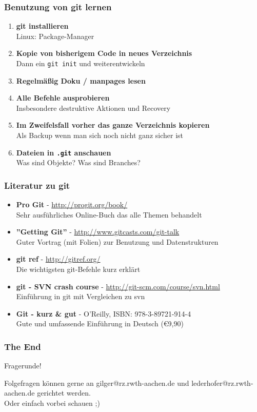 \begin{frame}
  \frametitle{Benutzung von git lernen}
  \begin{enumerate}
    \item {\bf git installieren} \\ Linux: Package-Manager
    \item {\bf Kopie von bisherigem Code in neues Verzeichnis} \\ Dann ein {\tt git init} und weiterentwickeln
    \item {\bf Regelmäßig Doku / manpages lesen}
    \item {\bf Alle Befehle ausprobieren} \\ Insbesondere destruktive Aktionen und Recovery
    \item {\bf Im Zweifelsfall vorher das ganze Verzeichnis kopieren} \\ Als Backup wenn man sich noch nicht ganz sicher ist
    \item {\bf Dateien in {\tt .git} anschauen} \\ Was sind Objekte? Was sind Branches?
  \end{enumerate}
\end{frame}

\begin{frame}
  \frametitle{Literatur zu git}
  \begin{itemize}
    \item {\bf Pro Git} - \url{http://progit.org/book/} \\ Sehr ausführliches Online-Buch das alle Themen behandelt
    \item {\bf ''Getting Git''} - \url{http://www.gitcasts.com/git-talk} \\ Guter Vortrag (mit Folien) zur Benutzung und Datenstrukturen
    \item {\bf git ref} - \url{http://gitref.org/} \\ Die wichtigsten git-Befehle kurz erklärt
    \item {\bf git - SVN crash course} - \url{http://git-scm.com/course/svn.html} \\ Einführung in git mit Vergleichen zu svn
    \item {\bf Git - kurz \& gut} - O'Reilly, ISBN: 978-3-89721-914-4 \\ Gute und umfassende Einführung in Deutsch (\euro{9,90}) 
  \end{itemize}
\end{frame}

\begin{frame}
  \frametitle{The End}
  \begin{center}
  \Huge Fragerunde!
  \vspace{1.5cm}

  \small Folgefragen können gerne an gilger@rz.rwth-aachen.de und lederhofer@rz.rwth-aachen.de gerichtet werden. \\
  Oder einfach vorbei schauen ;)
  \end{center}
\end{frame}


